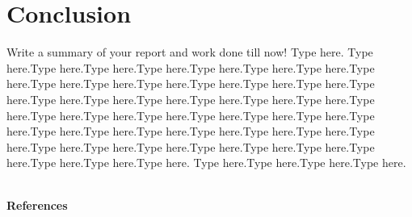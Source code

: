 \documentclass[10pt,a4paper,twocolumn]{article}
\begin{document}
	\vspace{4pt}
	
	\section{Conclusion}
	Write a summary of your report and work done till now!
	Type here. Type here.Type here.Type here.Type here.Type here.Type here.Type here.Type here.Type here.Type here.Type here.Type here.Type here.Type here.Type here.Type here.Type here.Type here.Type here.Type here.Type here.Type here.Type here.Type here.Type here.Type here.Type here.Type here.Type here.Type here.Type here.Type here.Type here.Type here.Type here.Type here.Type here.Type here.Type here.Type here.Type here.Type here.Type here.Type here.Type here.Type here. Type here.Type here.Type here.Type here.
	\\\\
	
	
	\begin{center}
		\textbf{\Large References} \par
	\end{center} \par
\end{document}
